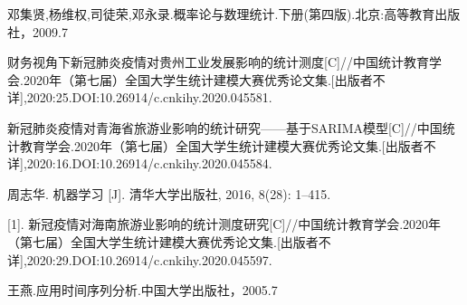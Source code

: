 \documentclass[11pt,punct,twoside]{ctexart}
\begin{document}
\pagestyle{empty}

%

\pagestyle{fancy}
\lhead{}


\rhead{}
\lfoot{}
\rfoot{}

\setlength{\voffset}{-10mm}                        
\setlength{\topmargin}{0mm}
\setlength{\headheight}{6mm}
\setlength{\headsep}{9mm}
\setlength{\footskip}{7.5mm}
\setcounter{page}{1}%





%
%
%

%
%

%

\nocite{*}

\renewcommand\bibnumfmt[1]{\makebox[0.9cm][l]{[#1]}}
\setlength{\bibhang}{0em}


\begin{thebibliography}{99}
	邓集贤,杨维权,司徒荣,邓永录.概率论与数理统计.下册(第四版).北京:高等教育出版社，2009.7
	
	财务视角下新冠肺炎疫情对贵州工业发展影响的统计测度[C]//中国统计教育学会.2020年（第七届）全国大学生统计建模大赛优秀论文集.[出版者不详],2020:25.DOI:10.26914/c.cnkihy.2020.045581.
	
	新冠肺炎疫情对青海省旅游业影响的统计研究——基于SARIMA模型[C]//中国统计教育学会.2020年（第七届）全国大学生统计建模大赛优秀论文集.[出版者不详],2020:16.DOI:10.26914/c.cnkihy.2020.045584.
	
	周志华. 机器学习 [J]. 清华大学出版社, 2016, 8(28): 1–415.
	
	. 新冠疫情对海南旅游业影响的统计测度研究[C]//中国统计教育学会.2020年（第七届）全国大学生统计建模大赛优秀论文集.[出版者不详],2020:29.DOI:10.26914/c.cnkihy.2020.045597.
	
	王燕.应用时间序列分析.中国大学出版社，2005.7
\end{thebibliography}	




%
\end{document}
